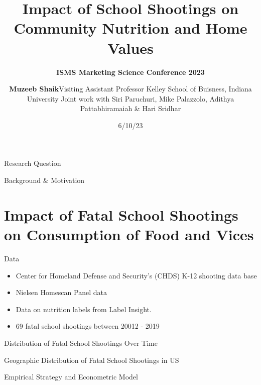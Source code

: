 \documentclass[
  ignorenonframetext,
]{beamer}
\title{Impact of School Shootings on Community Nutrition and Home
Values}
\subtitle{ \textbf{ISMS Marketing Science Conference 2023}}
\author{\textbf{Muzeeb Shaik}Visiting Assistant Professor Kelley School
of Buisness, Indiana University Joint work with Siri Paruchuri, Mike
Palazzolo, Adithya Pattabhiramaiah \& Hari Sridhar}
\date{6/10/23}
\begin{document}
\frame{\titlepage}
\ifdefined\Shaded\renewenvironment{Shaded}{\begin{tcolorbox}[enhanced, boxrule=0pt, frame hidden, interior hidden, sharp corners, breakable, borderline west={3pt}{0pt}{shadecolor}]}{\end{tcolorbox}}\fi

\begin{frame}{Research Question}
\protect\hypertarget{research-question}{}
\end{frame}

\begin{frame}{Background \& Motivation}
\protect\hypertarget{background-motivation}{}
\end{frame}

\hypertarget{impact-of-fatal-school-shootings-on-consumption-of-food-and-vices}{%
\section{Impact of Fatal School Shootings on Consumption of Food and
Vices}\label{impact-of-fatal-school-shootings-on-consumption-of-food-and-vices}}

\begin{frame}{Data}
\protect\hypertarget{data}{}
\begin{itemize}
\item
  Center for Homeland Defense and Security's (CHDS) K-12 shooting data
  base
\item
  Nielsen Homescan Panel data
\item
  Data on nutrition labels from Label Insight.
\item
  69 fatal school shootings between 20012 - 2019
\end{itemize}
\end{frame}

\begin{frame}{Distribution of Fatal School Shootings Over Time}
\protect\hypertarget{distribution-of-fatal-school-shootings-over-time}{}
\end{frame}

\begin{frame}{Geographic Distribution of Fatal School Shootings in US}
\protect\hypertarget{geographic-distribution-of-fatal-school-shootings-in-us}{}
\end{frame}

\begin{frame}{Empirical Strategy and Econometric Model}
\protect\hypertarget{empirical-strategy-and-econometric-model}{}
\end{frame}
\end{document}
